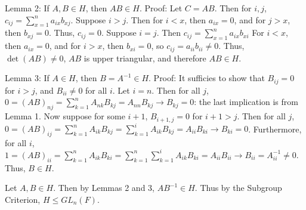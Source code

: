\documentclass[12pt]{article}
\begin{document}
\begin{itemize}
Lemma 2: If $A, B \in H$, then $AB \in H$. Proof: Let $C = AB$. Then for $i, j$, $c_{ij} = \sum_{x = 1}^{n} a_{ix}b_{xj}$. Suppose $i > j$. Then for $i < x$, then $a_{ix} = 0$, and for $j > x$, then $b_{xj} = 0$. Thus, $c_{ij} = 0$. Suppose $i = j$. Then $c_{ij} = \sum_{x=1}^n a_{ix}b_{xi}$ For $i < x$, then $a_{ix} = 0$, and for $i > x$, then $b_{xi} = 0$, so $c_{ij} = a_{ii}b_{ii} \neq 0$. Thus, $\det(AB) \neq 0$, $AB$ is upper triangular, and therefore $AB \in H$.

Lemma 3: If $A \in H$, then $B = A^{-1} \in H$. Proof: 
It sufficies to show that $B_{ij} = 0$ for $i > j$, and $B_{ii} \neq 0$ for all $i$. Let $i = n$. Then for all $j$, $0 = (AB)_{nj} = \sum_{k=1}^n A_{nk}B_{kj} = A_{nn}B_{kj} \rightarrow B_{kj} = 0$: the last implication is from Lemma 1. Now suppose for some $i + 1$, $B_{i+1, j} = 0$ for $i+1 > j$. Then for all $j$, $0 = (AB)_{ij} = \sum_{k=1}^n A_{ik}B_{kj} = \sum_{k=1}^i A_{ik}B_{kj} = A_{ii}B_{ki} \rightarrow B_{ki} = 0$. Furthermore, for all $i$, $1 = (AB)_{ii} = \sum_{k=1}^n A_{ik}B_{ki} = \sum_{k=1}^n \sum_{k=1}^i A_{ik}B_{ki} = A_{ii}B_{ii} \rightarrow B_{ii} = A_{ii}^{-1} \neq 0$. Thus, $B \in H$.

Let $A, B \in H$. Then by Lemmas 2 and 3, $AB^{-1} \in H$. Thus by the Subgroup Criterion, $H \leq GL_n(F)$. 
\end{itemize}
\end{document}
